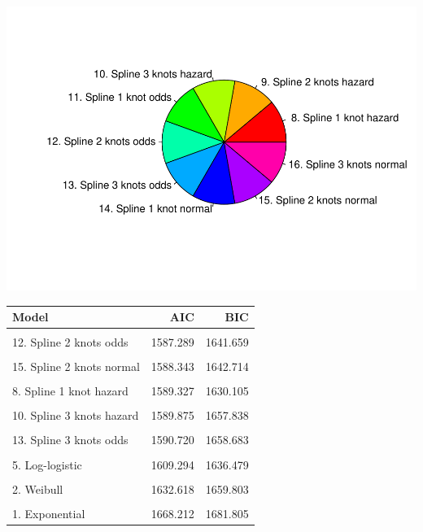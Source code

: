 \documentclass[]{article}
\begin{document}
\begin{flushleft}\includegraphics{Images/spline-1} \end{flushleft}

\begin{table}[H]
\centering
\begin{tabular}{lrr}
\toprule
Model & AIC & BIC\\
\midrule
\cellcolor{gray!6}{9. Spline 2 knots hazard} & \cellcolor{gray!6}{1585.894} & \cellcolor{gray!6}{1640.264}\\
12. Spline 2 knots odds & 1587.289 & 1641.659\\
\cellcolor{gray!6}{14. Spline 1 knot normal} & \cellcolor{gray!6}{1587.682} & \cellcolor{gray!6}{1628.460}\\
15. Spline 2 knots normal & 1588.343 & 1642.714\\
\cellcolor{gray!6}{7. Generalised Gamma} & \cellcolor{gray!6}{1589.049} & \cellcolor{gray!6}{1629.826}\\
8. Spline 1 knot hazard & 1589.327 & 1630.105\\
\cellcolor{gray!6}{16. Spline 3 knots normal} & \cellcolor{gray!6}{1589.832} & \cellcolor{gray!6}{1657.795}\\
10. Spline 3 knots hazard & 1589.875 & 1657.838\\
\cellcolor{gray!6}{11. Spline 1 knot odds} & \cellcolor{gray!6}{1590.221} & \cellcolor{gray!6}{1630.999}\\
13. Spline 3 knots odds & 1590.720 & 1658.683\\
\cellcolor{gray!6}{4. Log-normal} & \cellcolor{gray!6}{1592.880} & \cellcolor{gray!6}{1620.066}\\
5. Log-logistic & 1609.294 & 1636.479\\
\cellcolor{gray!6}{6. Gamma} & \cellcolor{gray!6}{1621.982} & \cellcolor{gray!6}{1649.167}\\
2. Weibull & 1632.618 & 1659.803\\
\cellcolor{gray!6}{3. Gompertz} & \cellcolor{gray!6}{1660.954} & \cellcolor{gray!6}{1688.140}\\
1. Exponential & 1668.212 & 1681.805\\
\bottomrule
\end{tabular}
\end{table}
\end{document}
